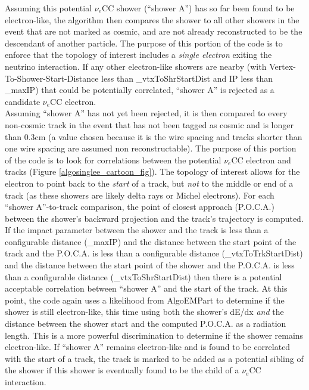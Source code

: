Assuming this potential $\nu_e$CC shower (``shower A'') has so far been found to be electron-like, the algorithm then compares the shower to all other showers in the event that are not marked as cosmic, and are not already reconstructed to be the descendant of another particle. The purpose of this portion of the code is to enforce that the topology of interest includes a \textit{single electron} exiting the neutrino interaction. If any other electron-like showers are nearby (with Vertex-To-Shower-Start-Distance less than \_vtxToShrStartDist and IP less than \_maxIP) that could be potentially correlated, ``shower A'' is rejected as a candidate $\nu_e$CC electron.\\

Assuming ``shower A'' has not yet been rejected, it is then compared to every non-cosmic track in the event that has not been tagged as cosmic and is longer than 0.3cm (a value chosen because it is the wire spacing and tracks shorter than one wire spacing are assumed non reconstructable). The purpose of this portion of the code is to look for correlations between the potential $\nu_e$CC electron and tracks (Figure \ref{algosinglee_cartoon_fig}). The topology of interest allows for the electron to point back to the \textit{start} of a track, but \textit{not} to the middle or end of a track (as these showers are likely delta rays or Michel electrons). For each ``shower A''-to-track comparison, the point of closest approach (P.O.C.A.) between the shower's backward projection and the track's trajectory is computed. If the impact parameter between the shower and the track is less than a configurable distance (\_maxIP) and the distance between the start point of the track and the P.O.C.A. is less than a configurable distance (\_vtxToTrkStartDist) and the distance between the start point of the shower and the P.O.C.A. is less than a configurable distance (\_vtxToShrStartDist) then there is a potential acceptable correlation between ``shower A'' and the start of the track. At this point, the code again uses a likelihood from AlgoEMPart to determine if the shower is still electron-like, this time using both the shower's dE/dx \textit{and} the distance between the shower start and the computed P.O.C.A. as a radiation length. This is a more powerful discrimination to determine if the shower remains electron-like. If ``shower A'' remains electron-like and is found to be correlated with the start of a track, the track is marked to be added as a potential sibling of the shower if this shower is eventually found to be the child of a $\nu_e$CC interaction.\\

